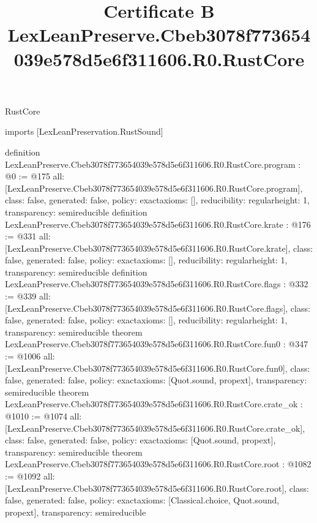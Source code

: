 \begin{lexlean}{RustCore}
\title{Certificate B LexLeanPreserve.Cbeb3078f773654039e578d5e6f311606.R0.RustCore}
\begin{coremodule}
imports [LexLeanPreservation.RustSound]

definition LexLeanPreserve.Cbeb3078f773654039e578d5e6f311606.R0.RustCore.program : @0 := @175 {
  all: [LexLeanPreserve.Cbeb3078f773654039e578d5e6f311606.R0.RustCore.program],
  class: false,
  generated: false,
  policy: exact{axioms: []},
  reducibility: regular{height: 1},
  transparency: semireducible
}
definition LexLeanPreserve.Cbeb3078f773654039e578d5e6f311606.R0.RustCore.krate : @176 := @331 {
  all: [LexLeanPreserve.Cbeb3078f773654039e578d5e6f311606.R0.RustCore.krate],
  class: false,
  generated: false,
  policy: exact{axioms: []},
  reducibility: regular{height: 1},
  transparency: semireducible
}
definition LexLeanPreserve.Cbeb3078f773654039e578d5e6f311606.R0.RustCore.flags : @332 := @339 {
  all: [LexLeanPreserve.Cbeb3078f773654039e578d5e6f311606.R0.RustCore.flags],
  class: false,
  generated: false,
  policy: exact{axioms: []},
  reducibility: regular{height: 1},
  transparency: semireducible
}
theorem LexLeanPreserve.Cbeb3078f773654039e578d5e6f311606.R0.RustCore.fun0 : @347 := @1006 {
  all: [LexLeanPreserve.Cbeb3078f773654039e578d5e6f311606.R0.RustCore.fun0],
  class: false,
  generated: false,
  policy: exact{axioms: [Quot.sound, propext]},
  transparency: semireducible
}
theorem LexLeanPreserve.Cbeb3078f773654039e578d5e6f311606.R0.RustCore.crate_ok : @1010 := @1074 {
  all: [LexLeanPreserve.Cbeb3078f773654039e578d5e6f311606.R0.RustCore.crate_ok],
  class: false,
  generated: false,
  policy: exact{axioms: [Quot.sound, propext]},
  transparency: semireducible
}
theorem LexLeanPreserve.Cbeb3078f773654039e578d5e6f311606.R0.RustCore.root : @1082 := @1092 {
  all: [LexLeanPreserve.Cbeb3078f773654039e578d5e6f311606.R0.RustCore.root],
  class: false,
  generated: false,
  policy: exact{axioms: [Classical.choice, Quot.sound, propext]},
  transparency: semireducible
}


\end{coremodule}
\end{lexlean}

